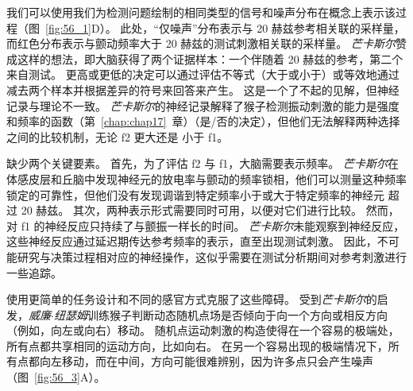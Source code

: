 我们可以使用我们为检测问题绘制的相同类型的信号和噪声分布在概念上表示该过程（图~\ref{fig:56_1}D）。
此处，“仅噪声”分布表示与 20 赫兹参考相关联的采样量，而红色分布表示与颤动频率大于 20 赫兹的测试刺激相关联的采样量。
\textit{芒卡斯尔}赞成这样的想法，即大脑获得了两个证据样本：一个伴随着 20 赫兹的参考，第二个来自测试。
更高或更低的决定可以通过评估不等式（大于或小于）或等效地通过减去两个样本并根据差异的符号来回答来产生。
这是一个了不起的见解，但神经记录与理论不一致。
\textit{芒卡斯尔}的神经记录解释了猴子检测振动刺激的能力是强度和频率的函数（第~\ref{chap:chap17}~章）（是/否的决定），但他们无法解释两种选择之间的比较机制，无论 f2 更大还是 小于 f1。


缺少两个关键要素。
首先，为了评估 f2 与 f1，大脑需要表示频率。
\textit{芒卡斯尔}在体感皮层和丘脑中发现神经元的放电率与颤动的频率锁相，他们可以测量这种频率锁定的可靠性，但他们没有发现调谐到特定频率小于或大于特定频率的神经元 超过 20 赫兹。
其次，两种表示形式需要同时可用，以便对它们进行比较。
然而，对 f1 的神经反应只持续了与颤振一样长的时间。
\textit{芒卡斯尔}未能观察到神经反应，这些神经反应通过延迟期传达参考频率的表示，直至出现测试刺激。
因此，不可能研究与决策过程相对应的神经操作，这似乎需要在测试分析期间对参考刺激进行一些追踪。


使用更简单的任务设计和不同的感官方式克服了这些障碍。
受到\textit{芒卡斯尔}的启发，\textit{威廉$\cdot$纽瑟姆}训练猴子判断动态随机点场是否倾向于向一个方向或相反方向（例如，向左或向右）移动。
随机点运动刺激的构造使得在一个容易的极端处，所有点都共享相同的运动方向，比如向右。
在另一个容易出现的极端情况下，所有点都向左移动，而在中间，方向可能很难辨别，因为许多点只会产生噪声（图~\ref{fig:56_3}A）。


